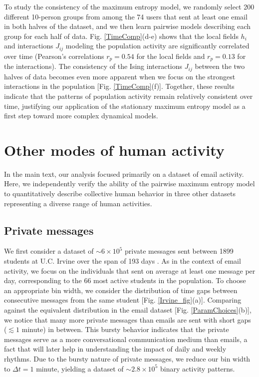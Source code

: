 \documentclass[aps,reprint,superscriptaddress,amsmath,amssymb,longbibliography]{revtex4-1}
\begin{document}
To study the consistency of the maximum entropy model, we randomly select 200 different 10-person groups from among the 74 users that sent at least one email in both halves of the dataset, and we then learn pairwise models describing each group for each half of data. Fig. \ref{TimeComp}(d-e) shows that the local fields $h_i$ and interactions $J_{ij}$ modeling the population activity are significantly correlated over time (Pearson's correlations $r_p = 0.54$ for the local fields and $r_p = 0.13$ for the interactions). The consistency of the Ising interactions $J_{ij}$ between the two halves of data becomes even more apparent when we focus on the strongest interactions in the population [Fig. \ref{TimeComp}(f)]. Together, these results indicate that the patterns of population activity remain relatively consistent over time, justifying our application of the stationary maximum entropy model as a first step toward more complex dynamical models.

\section{Other modes of human activity}

In the main text, our analysis focused primarily on a dataset of email activity. Here, we independently verify the ability of the pairwise maximum entropy model to quantitatively describe collective human behavior in three other datasets representing a diverse range of human activities.

\subsection{Private messages}

\label{Irvine}

We first consider a dataset of $\sim 6\times 10^5$ private messages sent between 1899 students at U.C. Irvine over the span of 193 days \cite{Panzarasa-01}. As in the context of email activity, we focus on the individuals that sent on average at least one message per day, corresponding to the 66 most active students in the population. To choose an appropriate bin width, we consider the distribution of time gaps between consecutive messages from the same student [Fig. \ref{Irvine_fig}(a)]. Comparing against the equivalent distribution in the email dataset [Fig. \ref{ParamChoices}(b)], we notice that many more private messages than emails are sent with short gaps ($\lesssim 1$ minute) in between. This bursty behavior indicates that the private messages serve as a more conversational communication medium than emails, a fact that will later help in understanding the impact of daily and weekly rhythms. Due to the bursty nature of private messages, we reduce our bin width to $\Delta t = 1$ minute, yielding a dataset of $\sim 2.8\times 10^5$ binary activity patterns.
\end{document}
